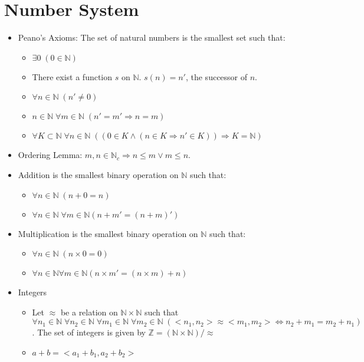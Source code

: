\documentclass[11pt, twocolumn]{article}
\newenvironment{compactitem}
{\begin{itemize}
  \setlength{\itemsep}{1px}
  \setlength{\parskip}{0pt}
  \setlength{\parsep}{0pt}}
{\end{itemize}}
\begin{document}
\section{Number System}
\begin{compactitem}
\item Peano's Axioms: The set of natural numbers is the smallest set such that:
\begin{compactitem}
\item $\exists 0 \; (0 \in \mathbb{N})$
\item There exist a function $s$ on $\mathbb{N}$. $s(n) = n'$, the successor of $n$.
\item $\forall n \in \mathbb{N} \;(n' \neq 0)$
\item $n \in \mathbb{N}\; \forall m \in \mathbb{N} \; (n' = m' \Rightarrow n=m)$
\item $\forall K \subset \mathbb{N} \; \forall n\in \mathbb{N} \;((0\in K \wedge (n \in K \Rightarrow n' \in K))\Rightarrow K = \mathbb{N} )$  
\end{compactitem}
\item Ordering Lemma: $m, n\in \mathbb{N}_c \Rightarrow n\leq m \vee m\leq n$.
\item Addition is the smallest binary operation on $\mathbb{N}$ such that:
\begin{compactitem}
\item $\forall n \in \mathbb{N} \;(n+0=n)$
\item $ \forall n\in \mathbb{N} \; \forall m\in \mathbb{N} (n+m' = (n+m)')$
\end{compactitem}
\item Multiplication is the smallest binary operation on $\mathbb{N}$ such that:
\begin{compactitem}
\item $\forall n \in \mathbb{N} \; (n\times 0 = 0)$
\item $\forall n \in \mathbb{N} \forall m \in \mathbb{N} (n\times m' = (n\times m)+n)$
\end{compactitem}
\item Integers
\begin{compactitem}
\item Let $\approx$ be a relation on $\mathbb{N} \times \mathbb{N}$ such that $\forall n_1 \in \mathbb{N} \; \forall n_2 \in \mathbb{N} \; \forall m_1 \in \mathbb{N} \; \forall m_2 \in \mathbb{N} \;(<n_1, n_2> \approx <m_1, m_2> \Leftrightarrow n_2+m_1=m_2+n_1)$. The set of integers is given by $\mathbb{Z} = (\mathbb{N} \times \mathbb{N})/\approx$
\item $a+b = <a_1+b_1, a_2+b_2>$

\end{compactitem}
\end{compactitem}
\end{document}

